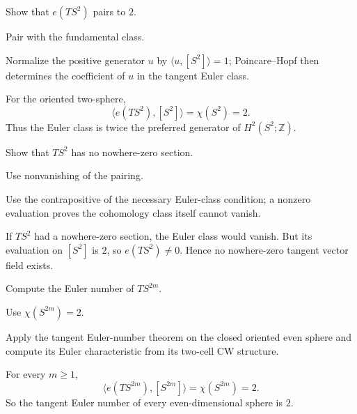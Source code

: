 \begin{exercise}\label{exr:viii32-06}
Show that $e(TS^2)$ pairs to $2$.
\end{exercise}
\begin{hint}
Pair with the fundamental class.

Normalize the positive generator \(u\) by \(\langle u,[S^2]\rangle=1\); Poincare--Hopf then determines the coefficient of \(u\) in the tangent Euler class.
\end{hint}
\begin{solution}
For the oriented two-sphere,
\[
\langle e(TS^2),[S^2]\rangle=\chi(S^2)=2.
\]
Thus the Euler class is twice the preferred generator of \(H^2(S^2;\mathbb Z)\).
\end{solution}

\begin{exercise}\label{exr:viii32-07}
Show that $TS^2$ has no nowhere-zero section.
\end{exercise}
\begin{hint}
Use nonvanishing of the pairing.

Use the contrapositive of the necessary Euler-class condition; a nonzero evaluation proves the cohomology class itself cannot vanish.
\end{hint}
\begin{solution}
If \(TS^2\) had a nowhere-zero section, the Euler class would vanish. But its evaluation on \([S^2]\) is \(2\), so \(e(TS^2)\ne0\). Hence no nowhere-zero tangent vector field exists.
\end{solution}

\begin{exercise}\label{exr:viii32-08}
Compute the Euler number of $TS^{2m}$.
\end{exercise}
\begin{hint}
Use $\chi(S^{2m})=2$.

Apply the tangent Euler-number theorem on the closed oriented even sphere and compute its Euler characteristic from its two-cell CW structure.
\end{hint}
\begin{solution}
For every \(m\ge1\),
\[
\langle e(TS^{2m}),[S^{2m}]\rangle=\chi(S^{2m})=2.
\]
So the tangent Euler number of every even-dimensional sphere is \(2\).
\end{solution}

